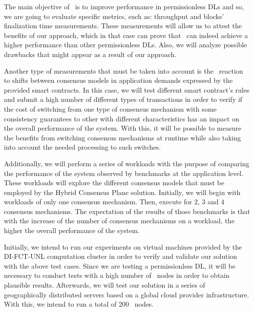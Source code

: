 The main objective of \mysystem~is to improve performance in permissionless \gls{DL}s and so, we are going to evaluate specific metrics, such as: throughput and blocks' finalization time measurements. These measurements will allow us to attest the benefits of our approach, which in that case can prove that \mysystem~can indeed achieve a higher performance than other permissionless \gls{DL}s. Also, we will analyze possible drawbacks that might appear as a result of our approach.


Another type of measurements that must be taken into account is the \mysystem~reaction to shifts between consensus models in application demands expressed by the provided smart contracts. In this case, we will test different smart contract's rules and submit a high number of different types of transactions in order to verify if the cost of switching from one type of consensus mechanism with some consistency guarantees to other with different characteristics has an impact on the overall performance of the system. With this, it will be possible to measure the benefits from switching consensus mechanisms at runtime while also taking into account the needed processing to such switches.


Additionally, we will perform a series of workloads with the purpose of comparing the performance of the system observed by benchmarks at the application level. These workloads will explore the different consensus models that must be employed by the Hybrid Consensus Plane solution. Initially, we will begin with workloads of only one consensus mechanism. Then, execute for $2$, $3$ and $4$ consensus mechanisms. The expectation of the results of those benchmarks is that with the increase of the number of consensus mechanisms on a workload, the higher the overall performance of the system.


Initially, we intend to run our experiments on virtual machines provided by the DI-FCT-UNL computation cluster in order to verify and validate our solution with the above test cases. Since we are testing a permissionless \gls{DL}, it will be necessary to conduct tests with a high number of \mysystem~nodes in order to obtain plausible results. Afterwards, we will test our solution in a series of geographically distributed servers based on a global cloud provider infrastructure. With this, we intend to run a total of 200 \mysystem~nodes.


